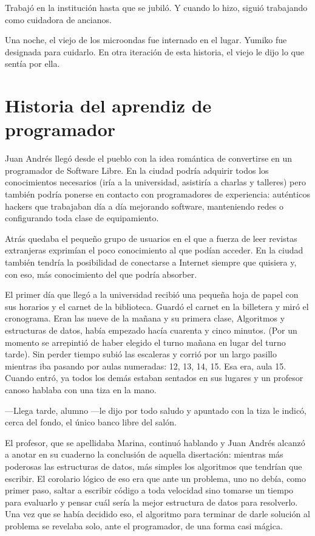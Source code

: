 \documentclass[12pt,twoside,openright]{book}
\begin{document}
Trabajó en la institución hasta que se jubiló. Y cuando lo hizo, siguió trabajando como cuidadora de ancianos.

Una noche, el viejo de los microondas fue internado en el lugar. Yumiko fue designada para cuidarlo. En otra iteración de esta historia, el viejo le dijo lo que sentía por ella.





\chapter*{Historia del aprendiz de programador} 



Juan Andrés llegó desde el pueblo con la idea romántica de convertirse en un programador de Software Libre. En la ciudad podría adquirir todos los conocimientos necesarios (iría a la universidad, asistiría a charlas y talleres) pero también podría ponerse en contacto con programadores de experiencia: auténticos hackers que trabajaban día a día mejorando software, manteniendo redes o configurando toda clase de equipamiento.

Atrás quedaba el pequeño grupo de usuarios en el que a fuerza de leer revistas extranjeras exprimían el poco conocimiento al que podían acceder. En la ciudad también tendría la posibilidad de conectarse a Internet siempre que quisiera y, con eso, más conocimiento del que podría absorber.

El primer día que llegó a la universidad recibió una pequeña hoja de papel con sus horarios y el carnet de la biblioteca. Guardó el carnet en la billetera y miró el cronograma. Eran las nueve de la mañana y su primera clase, Algoritmos y estructuras de datos, había empezado hacía cuarenta y cinco minutos. (Por un momento se arrepintió de haber elegido el turno mañana en lugar del turno tarde). Sin perder tiempo subió las escaleras y corrió por un largo pasillo mientras iba pasando por aulas numeradas: 12, 13, 14, 15. Esa era, aula 15. Cuando entró, ya todos los demás estaban sentados en sus lugares y un profesor canoso hablaba con una tiza en la mano.

---Llega tarde, alumno ---le dijo por todo saludo y apuntado con la tiza le indicó, cerca del fondo, el único banco libre del salón.

El profesor, que se apellidaba Marina, continuó hablando y Juan Andrés alcanzó a anotar en su cuaderno la conclusión de aquella disertación: mientras más poderosas las estructuras de datos, más simples los algoritmos que tendrían que escribir. El corolario lógico de eso era que ante un problema, uno no debía, como primer paso, saltar a escribir código a toda velocidad sino tomarse un tiempo para evaluarlo y pensar cuál sería la mejor estructura de datos para resolverlo. Una vez que se había decidido eso, el algoritmo para terminar de darle solución al problema se revelaba solo, ante el programador, de una forma casi mágica.
\end{document}
